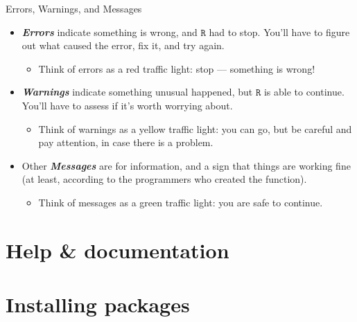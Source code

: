 \documentclass[
  11pt,
  ignorenonframetext,
]{beamer}
\providecommand{\tightlist}{%
  \setlength{\itemsep}{0pt}\setlength{\parskip}{0pt}}
\begin{document}
\begin{frame}{Errors, Warnings, and Messages}
\protect\hypertarget{errors-warnings-and-messages-1}{}
\begin{itemize}
\item
  \textbf{\emph{Errors}} indicate something is wrong, and \(\texttt{R}\)
  had to stop. You'll have to figure out what caused the error, fix it,
  and try again.

  \begin{itemize}
  \tightlist
  \item
    \textcolor[rgb]{0.8,0,0}{Think of errors as a red traffic light: stop --- something is wrong!
    }
  \end{itemize}
\item
  \textbf{\emph{Warnings}} indicate something unusual happened, but
  \(\texttt{R}\) is able to continue. You'll have to assess if it's
  worth worrying about.

  \begin{itemize}
  \tightlist
  \item
    \textcolor[rgb]{0.9,0.7,0}{Think of warnings as a yellow traffic light: you can go, but be careful and pay attention, in case there is a problem.
    }
  \end{itemize}
\item
  Other \textbf{\emph{Messages}} are for information, and a sign that
  things are working fine (at least, according to the programmers who
  created the function).

  \begin{itemize}
  \tightlist
  \item
    \textcolor[rgb]{0,0.6,0}{Think of messages as a green traffic light: you are safe to continue.}
  \end{itemize}
\end{itemize}

\end{frame}

\hypertarget{help-documentation}{%
\section{Help \& documentation}\label{help-documentation}}

\hypertarget{installing-packages}{%
\section{Installing packages}\label{installing-packages}}
\end{document}
